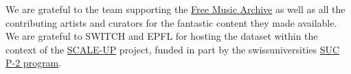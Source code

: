 \documentclass{article}
\begin{document}
We are grateful to the team supporting the \href{https://freemusicarchive.org}{Free Music Archive} as well as all the contributing artists and curators for the fantastic content they made available.
We are grateful to SWITCH and EPFL for hosting the dataset within the context
of the \href{https://projects.switch.ch/scale-up}{SCALE-UP} project, funded in
part by the swissuniversities \href{http://www.swissuniversities.ch/isci}{SUC
P-2 program}.


\end{document}
